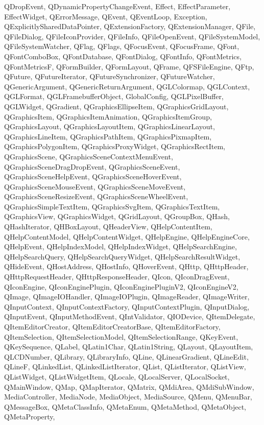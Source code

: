 {{QDropEvent, QDynamicPropertyChangeEvent, Effect, EffectParameter, EffectWidget,
QErrorMessage, QEvent, QEventLoop, Exception, QExplicitlySharedDataPointer,
QExtensionFactory, QExtensionManager, QFile, QFileDialog, QFileIconProvider,
QFileInfo, QFileOpenEvent, QFileSystemModel, QFileSystemWatcher, QFlag, QFlags,
QFocusEvent, QFocusFrame, QFont, QFontComboBox, QFontDatabase, QFontDialog,
QFontInfo, QFontMetrics, QFontMetricsF, QFormBuilder, QFormLayout, QFrame,
QFSFileEngine, QFtp, QFuture, QFutureIterator, QFutureSynchronizer,
QFutureWatcher, QGenericArgument, QGenericReturnArgument, QGLColormap,
QGLContext, QGLFormat, QGLFramebufferObject, GlobalConfig, QGLPixelBuffer,
QGLWidget, QGradient, QGraphicsEllipseItem, QGraphicsGridLayout, QGraphicsItem,
QGraphicsItemAnimation, QGraphicsItemGroup, QGraphicsLayout,
QGraphicsLayoutItem, QGraphicsLinearLayout, QGraphicsLineItem,
QGraphicsPathItem, QGraphicsPixmapItem, QGraphicsPolygonItem,
QGraphicsProxyWidget, QGraphicsRectItem, QGraphicsScene,
QGraphicsSceneContextMenuEvent, QGraphicsSceneDragDropEvent,
QGraphicsSceneEvent, QGraphicsSceneHelpEvent, QGraphicsSceneHoverEvent,
QGraphicsSceneMouseEvent, QGraphicsSceneMoveEvent, QGraphicsSceneResizeEvent,
QGraphicsSceneWheelEvent, QGraphicsSimpleTextItem, QGraphicsSvgItem,
QGraphicsTextItem, QGraphicsView, QGraphicsWidget, QGridLayout, QGroupBox,
QHash, QHashIterator, QHBoxLayout, QHeaderView, QHelpContentItem,
QHelpContentModel, QHelpContentWidget, QHelpEngine, QHelpEngineCore, QHelpEvent,
QHelpIndexModel, QHelpIndexWidget, QHelpSearchEngine, QHelpSearchQuery,
QHelpSearchQueryWidget, QHelpSearchResultWidget, QHideEvent, QHostAddress,
QHostInfo, QHoverEvent, QHttp, QHttpHeader, QHttpRequestHeader,
QHttpResponseHeader, QIcon, QIconDragEvent, QIconEngine, QIconEnginePlugin,
QIconEnginePluginV2, QIconEngineV2, QImage, QImageIOHandler, QImageIOPlugin,
QImageReader, QImageWriter, QInputContext, QInputContextFactory,
QInputContextPlugin, QInputDialog, QInputEvent, QInputMethodEvent,
QIntValidator, QIODevice, QItemDelegate, QItemEditorCreator,
QItemEditorCreatorBase, QItemEditorFactory, QItemSelection, QItemSelectionModel,
QItemSelectionRange, QKeyEvent, QKeySequence, QLabel, QLatin1Char,
QLatin1String, QLayout, QLayoutItem, QLCDNumber, QLibrary, QLibraryInfo, QLine,
QLinearGradient, QLineEdit, QLineF, QLinkedList, QLinkedListIterator, QList,
QListIterator, QListView, QListWidget, QListWidgetItem, QLocale, QLocalServer,
QLocalSocket, QMainWindow, QMap, QMapIterator, QMatrix, QMdiArea, QMdiSubWindow,
MediaController, MediaNode, MediaObject, MediaSource, QMenu, QMenuBar,
QMessageBox, QMetaClassInfo, QMetaEnum, QMetaMethod, QMetaObject, QMetaProperty,
}}
